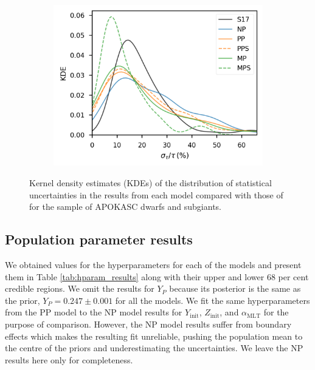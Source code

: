 \documentclass[a4paper,fleqn,usenatbib]{mnras}
\newcommand{\mlt}{\ensuremath{{\alpha_\mathrm{MLT}}}}
\begin{document}
\begin{figure}
\begin{subfigure}[b]{.33\linewidth}
    \end{subfigure}%
    \begin{subfigure}[b]{.33\linewidth}
        \centering
        \includegraphics[width=\linewidth]{figures/sigma_age.png}
    \end{subfigure}%
    \caption{Kernel density estimates (KDEs) of the distribution of statistical uncertainties in the results from each model compared with those of  for the sample of APOKASC dwarfs and subgiants.}
    \label{fig:unc-comp}
\end{figure}

\subsection{Population parameter results}\label{sec:hparam-results}

We obtained values for the hyperparameters for each of the models and present them in Table \ref{tab:hparam_results} along with their upper and lower 68 per cent credible regions. We omit the results for $Y_P$ because its posterior is the same as the prior, $Y_P=0.247\pm0.001$ for all the models. We fit the same hyperparameters from the PP model to the NP model results for $Y_\mathrm{init}$, $Z_\mathrm{init}$, and $\mlt$ for the purpose of comparison. However, the NP model results suffer from boundary effects which makes the resulting fit unreliable, pushing the population mean to the centre of the priors and underestimating the uncertainties. We leave the NP results here only for completeness.
\end{document}
